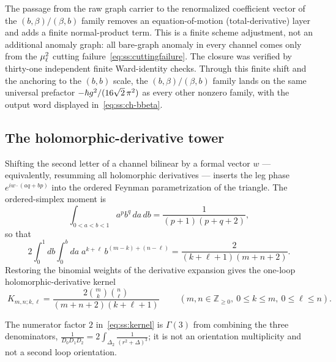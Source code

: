\begin{remark}%
\label{rem:ss:finiteshift}
The passage from the raw graph carrier to the renormalized coefficient vector
of the $(b,\beta)/(\beta,b)$ family removes an equation-of-motion
(total-derivative) layer and adds a finite normal-product term. This is a
finite scheme adjustment, not an additional anomaly graph: all bare-graph
anomaly in every channel comes only from the $\mu_\ell^{2}$ cutting
failure~\eqref{eq:ss:cuttingfailure}. The closure was verified by thirty-one
independent finite Ward-identity checks. Through this finite shift and the
anchoring to the $(b,b)$ scale, the $(b,\beta)/(\beta,b)$ family lands on the
same universal prefactor $-\hbar g^{2}/(16\sqrt2\,\pi^{2})$ as every other
nonzero family, with the output word displayed in~\eqref{eq:ss:ch-bbeta}.
\end{remark}

\subsection{The holomorphic-derivative tower}\label{sec:superspace:tower}

Shifting the second letter of a channel bilinear by a formal vector $w$ ---
equivalently, resumming all holomorphic derivatives --- inserts the leg phase
$e^{iw\cdot(aq+bp)}$ into the ordered Feynman parametrization of the triangle.
The ordered-simplex moment is
\begin{equation}\label{eq:ss:simplexmoment}
\int_{0<a<b<1}a^{p}b^{q}\,da\,db=\frac{1}{(p+1)(p+q+2)} ,
\end{equation}
so that
\begin{equation}\label{eq:ss:simplexderivation}
2\int_{0}^{1}\!db\int_{0}^{b}\!da\;a^{k+\ell}\,b^{(m-k)+(n-\ell)}
=\frac{2}{(k+\ell+1)(m+n+2)} .
\end{equation}
Restoring the binomial weights of the derivative expansion gives the one-loop
holomorphic-derivative kernel
\begin{equation}\label{eq:ss:kernel}
\boxed{\;
K_{m,n;k,\ell}
=\frac{2\binom{m}{k}\binom{n}{\ell}}{(m+n+2)(k+\ell+1)}\;}
\qquad
(m,n\in\mathbb Z_{\geq0},\ 0\leq k\leq m,\ 0\leq\ell\leq n).
\end{equation}

\begin{remark}\label{rem:ss:gamma3}
The numerator factor $2$ in~\eqref{eq:ss:kernel} is
$\Gamma(3)$ from combining the three denominators,
$\frac{1}{D_0D_1D_2}=2\int_{\Delta_2}\frac{1}{(r^{2}+\Delta)^{3}}$; it is not
an orientation multiplicity and not a second loop orientation.
\end{remark}

